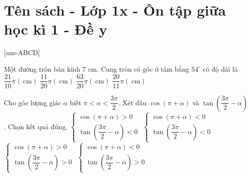 \section{Tên sách - Lớp 1x - Ôn tập giữa học kì 1 - Đề y}

\caulc

[ans-ABCD]

\begin{ex}%
Một đường tròn bán kính $7$ cm. Cung tròn có góc ở tâm bằng $54^{\circ}$ có độ dài là
\choice
{\True $\dfrac{21}{10} \pi(\mathrm{~cm})$}
{$\dfrac{11}{20} \pi(\mathrm{~cm})$}
{$\dfrac{63}{20} \pi(\mathrm{~cm})$}
{$\dfrac{20}{11} \pi(\mathrm{~cm})$}
\end{ex}

\begin{ex}%
Cho góc lượng giác $\alpha$ biết $\pi<\alpha<\dfrac{3 \pi}{2}$. Xét dấu $\cos (\pi+\alpha)$ và $\tan \left(\dfrac{3 \pi}{2}-\alpha\right)$. Chọn kết quả đúng.
\choice
{$\left\{\begin{array}{l}\cos (\pi+\alpha)>0 \\ \tan \left(\dfrac{3 \pi}{2}-\alpha\right)<0\end{array}\right.$}
{$\left\{\begin{array}{l}\cos (\pi+\alpha)<0 \\ \tan \left(\dfrac{3 \pi}{2}-\alpha\right)<0\end{array}\right.$}
{\True $\left\{\begin{array}{l}\cos (\pi+\alpha)>0 \\ \tan \left(\dfrac{3 \pi}{2}-\alpha\right)>0\end{array}\right.$}
{$\left\{\begin{array}{l}\cos (\pi+\alpha)<0 \\ \tan \left(\dfrac{3 \pi}{2}-\alpha\right)>0\end{array}\right.$}
\end{ex}

